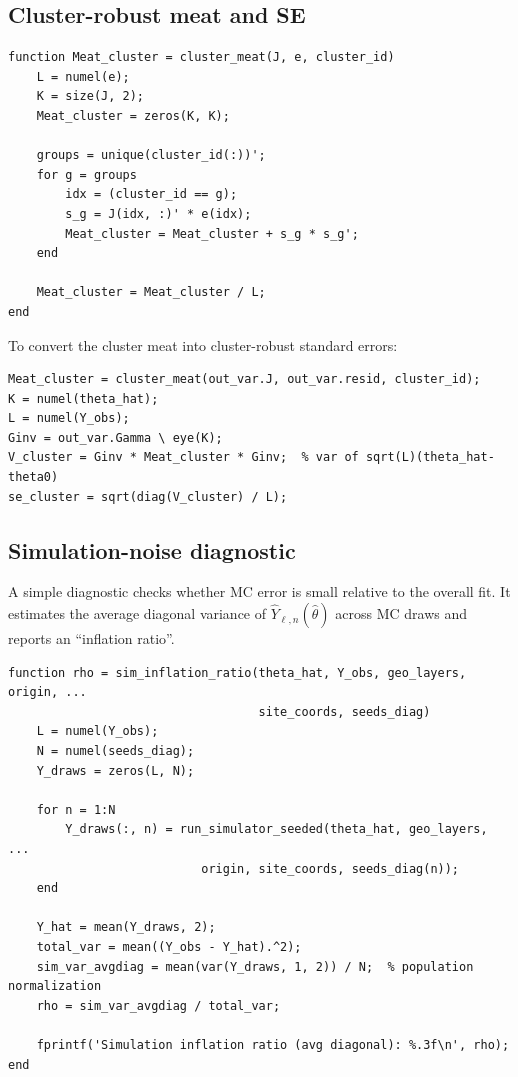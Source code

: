 \documentclass[11pt]{article}
\begin{document}
\subsection{Cluster-robust meat and SE}

\begin{lstlisting}
function Meat_cluster = cluster_meat(J, e, cluster_id)
    L = numel(e);
    K = size(J, 2);
    Meat_cluster = zeros(K, K);

    groups = unique(cluster_id(:))';
    for g = groups
        idx = (cluster_id == g);
        s_g = J(idx, :)' * e(idx);
        Meat_cluster = Meat_cluster + s_g * s_g';
    end

    Meat_cluster = Meat_cluster / L;
end
\end{lstlisting}

To convert the cluster meat into cluster-robust standard errors:

\begin{lstlisting}
Meat_cluster = cluster_meat(out_var.J, out_var.resid, cluster_id);
K = numel(theta_hat);
L = numel(Y_obs);
Ginv = out_var.Gamma \ eye(K);
V_cluster = Ginv * Meat_cluster * Ginv;  % var of sqrt(L)(theta_hat-theta0)
se_cluster = sqrt(diag(V_cluster) / L);
\end{lstlisting}

\subsection{Simulation-noise diagnostic}

A simple diagnostic checks whether MC error is small relative to the overall
fit. It estimates the average diagonal variance of $\hat Y_{\ell,n}(\hat\theta)$
across MC draws and reports an ``inflation ratio''.

\begin{lstlisting}
function rho = sim_inflation_ratio(theta_hat, Y_obs, geo_layers, origin, ...
                                   site_coords, seeds_diag)
    L = numel(Y_obs);
    N = numel(seeds_diag);
    Y_draws = zeros(L, N);

    for n = 1:N
        Y_draws(:, n) = run_simulator_seeded(theta_hat, geo_layers, ...
                           origin, site_coords, seeds_diag(n));
    end

    Y_hat = mean(Y_draws, 2);
    total_var = mean((Y_obs - Y_hat).^2);
    sim_var_avgdiag = mean(var(Y_draws, 1, 2)) / N;  % population normalization
    rho = sim_var_avgdiag / total_var;

    fprintf('Simulation inflation ratio (avg diagonal): %.3f\n', rho);
end
\end{lstlisting}
\end{document}
